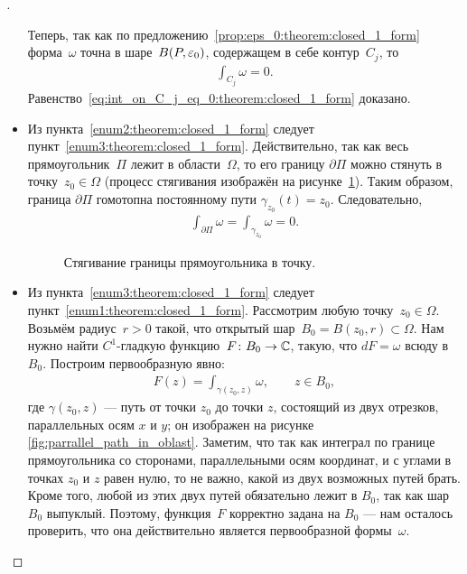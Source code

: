 \documentclass[../complex-analysis.tex]{subfiles}
\begin{document}
\begin{proof}[]
\begin{itemize}
   Теперь, так как по предложению~\ref{prop:eps_0:theorem:closed_1_form} форма~$\omega$ точна в шаре~$B(P,\varepsilon_0)$, содержащем в себе контур~$ C_j $, то
   \begin{align*}
    \int_{C_j} \omega = 0.
   \end{align*} Равенство~\eqref{eq:int_on_C_j_eq_0:theorem:closed_1_form} доказано.

  \item Из пункта~\ref{enum2:theorem:closed_1_form} следует пункт~\ref{enum3:theorem:closed_1_form}. Действительно, так как весь прямоугольник~$\Pi$ лежит в области~$ \Omega $, то его границу $\partial \Pi$ можно стянуть в точку~$z_0\in\Omega$ (процесс стягивания изображён на рисунке~\ref{fig:rectangle_into_point}). Таким образом, граница $\partial\Pi$ гомотопна постоянному пути $\gamma_{z_0}(t) = z_0$. Следовательно,
   \begin{align*}
    \int_{\partial\Pi} \omega = \int_{\gamma_{z_0}}   \omega = 0.
   \end{align*} 
   \begin{figure}[ht]
    \centering
    \caption{Стягивание границы прямоугольника в точку.}
    \label{fig:rectangle_into_point}
   \end{figure}

  \item Из пункта~\ref{enum3:theorem:closed_1_form} следует пункт~\ref{enum1:theorem:closed_1_form}. Рассмотрим любую точку~$ z_0 \in \Omega $. Возьмём радиус~$ r > 0 $ такой, что открытый шар~$ B_0 = B(z_0, r) \subset \Omega $. Нам нужно найти $ C^{1} $-гладкую функцию~$ F \colon B_0 \to \mathbb{C} $, такую, что $ dF = \omega $ всюду в $ B_0 $. Построим первообразную явно:
   \begin{align*}
    F(z) = \int_{\gamma(z_0, z)} \omega, \qquad z \in B_0,
   \end{align*} где $ \gamma(z_0, z) $ --- путь от точки $ z_0 $ до точки $ z $, состоящий из двух отрезков, параллельных осям $ x $ и $ y $; он изображен на рисунке \ref{fig:parrallel_path_in_oblast}. Заметим, что так как интеграл по границе прямоугольника со сторонами, параллельными осям координат, и с углами в точках $ z_0 $ и $ z $ равен нулю, то не важно, какой из двух возможных путей брать. Кроме того, любой из этих двух путей обязательно лежит в $ B_0 $, так как шар~$ B_0 $ выпуклый. Поэтому, функция~$ F $ корректно задана на $ B_0 $ --- нам осталось проверить, что она действительно является первообразной формы~$ \omega $.


\end{itemize}
\end{proof}
\end{document}
